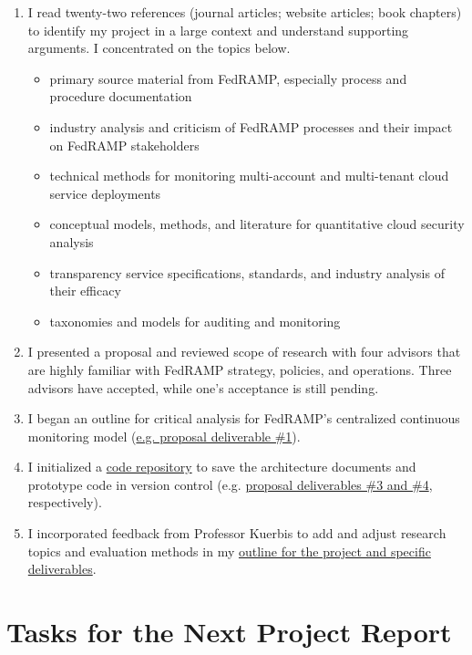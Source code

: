 \documentclass{jdf}
\begin{document}
\begin{enumerate}
    \item I read twenty-two references (journal articles; website articles; book chapters) to identify my project in a large context and understand supporting arguments. I concentrated on the topics below.
        \begin{itemize}
            \item primary source material from FedRAMP, especially process and procedure documentation
            \item industry analysis and criticism of FedRAMP processes and their impact on FedRAMP stakeholders
            \item technical methods for monitoring multi-account and multi-tenant cloud service deployments
            \item conceptual models, methods, and literature for quantitative cloud security analysis
            \item transparency service specifications, standards, and industry analysis of their efficacy
            \item taxonomies and models for auditing and monitoring
        \end{itemize}
    \item I presented a proposal and reviewed scope of research with four advisors that are highly familiar with FedRAMP strategy, policies, and operations. Three advisors have accepted, while one's acceptance is still pending.
    \item I began an outline for critical analysis for FedRAMP's centralized continuous monitoring model (\hyperlink{https://github.com/aj-stein/practicum_proposal/blob/main/paper.pdf}{e.g. proposal deliverable \#1}).
    \item I initialized a \hyperlink{https://github.com/aj-stein/conmotion.git}{code repository} to save the architecture documents and prototype code in version control (e.g. \hyperlink{https://github.com/aj-stein/practicum_proposal/blob/main/paper.pdf}{proposal deliverables \#3 and \#4}, respectively).
    \item I incorporated feedback from Professor Kuerbis to add and adjust research topics and evaluation methods in my \hyperlink{https://github.com/aj-stein/practicum/blob/main/notes.pdf}{outline for the project and specific deliverables}.
\end{enumerate}

\section*{Tasks for the Next Project Report}
\end{document}
